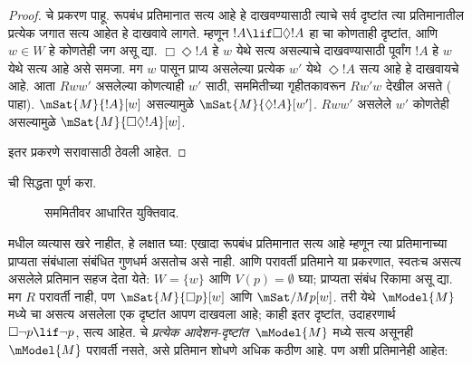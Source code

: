 \documentclass[../../../include/open-logic-section]{subfiles}
\begin{document}
\begin{proof}
   चे प्रकरण पाहू. रूपबंध प्रतिमानात सत्य आहे हे
  दाखवण्यासाठी त्याचे सर्व दृष्टांत त्या प्रतिमानातील
  प्रत्येक जगात सत्य आहेत हे दाखवावे लागते. म्हणून
  $!A \lif \Box\Diamond !A$ हा  चा कोणताही
  दृष्टांत, आणि $w \in W$ हे कोणतेही जग असू द्या.
  $\Box \Diamond
  !A$ हे $w$ येथे सत्य असल्याचे दाखवण्यासाठी पूर्वांग
  $!A$ हे $w$ येथे सत्य आहे असे समजा. मग $w$ पासून
  प्राप्य असलेल्या प्रत्येक $w'$ येथे $\Diamond !A$
  सत्य आहे हे दाखवायचे आहे. आता $Rww'$ असलेल्या
  कोणत्याही $w'$ साठी, सममितीच्या गृहीतकावरून $Rw'w$
  देखील असते ( पाहा).
  $\mSat{M}{!A}[w]$ असल्यामुळे
  $\mSat{M}{\Diamond !A}[w']$. $Rww'$ असलेले $w'$
  कोणतेही असल्यामुळे $\mSat{M}{\Box\Diamond!A}[w]$.

  इतर प्रकरणे सरावासाठी ठेवली आहेत.
\end{proof}

\begin{prob}
   ची सिद्धता पूर्ण करा.
\end{prob}

\begin{figure}
  \begin{center}
  \end{center}
\caption{सममितीवर आधारित युक्तिवाद.}
\end{figure}

 मधील व्यत्यास खरे नाहीत, हे लक्षात
घ्या: एखादा रूपबंध प्रतिमानात सत्य आहे म्हणून त्या प्रतिमानाच्या
प्राप्यता संबंधाला संबंधित गुणधर्म असतोच असे नाही.
 आणि परावर्ती प्रतिमाने या प्रकरणात,  स्वतःच
असत्य असलेले प्रतिमान सहज देता येते: $W = \{w\}$ आणि
$V(p) = \emptyset$ घ्या; प्राप्यता संबंध रिकामा असू द्या.
मग $R$ परावर्ती नाही, पण $\mSat{M}{\Box
  p}[w]$ आणि $\mSat/{M}{p}[w]$. तरी येथे~$\mModel{M}$
मध्ये  चा असत्य असलेला एक दृष्टांत आपण दाखवला आहे; काही इतर दृष्टांत,
उदाहरणार्थ $\Box \lnot p \lif \lnot p$, सत्य आहेत.
 चे \emph{प्रत्येक आदेशन-दृष्टांत}~$\mModel{M}$
मध्ये सत्य असूनही $\mModel{M}$ परावर्ती नसते, असे
प्रतिमान शोधणे अधिक कठीण आहे. पण अशी प्रतिमानेही आहेत:
\end{document}
